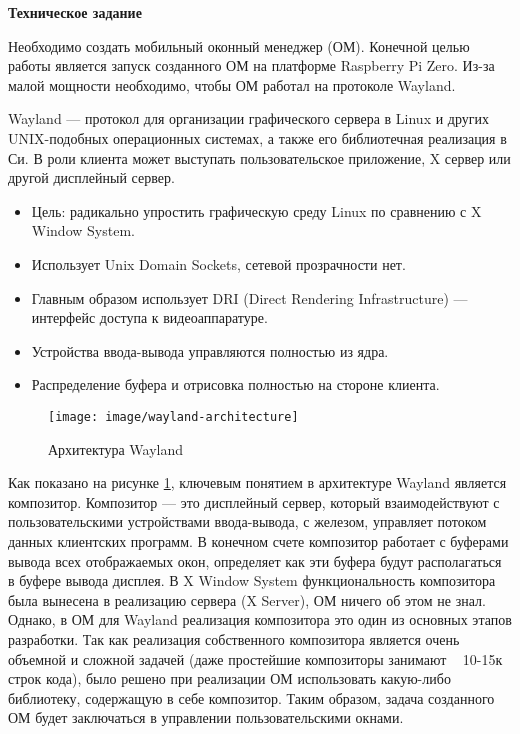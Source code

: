 \documentclass[11pt,a4paper]{extarticle}
\begin{document}
\large{\textbf{Техническое задание}}

Необходимо создать мобильный оконный менеджер (ОМ). Конечной целью работы является запуск созданного ОМ на платформе Raspberry Pi Zero. Из-за малой мощности необходимо, чтобы ОМ работал на протоколе Wayland.

Wayland --- протокол для организации графического сервера в Linux и других UNIX-подобных операционных системах, а также его библиотечная реализация в Си. В роли клиента может выступать пользовательское приложение, X сервер или другой дисплейный сервер. 
\begin{itemize}
\item Цель: радикально упростить графическую среду Linux по сравнению с X Window System.
\item Использует Unix Domain Sockets, сетевой прозрачности нет. 
\item Главным образом использует DRI (Direct Rendering Infrastructure) --- интерфейс доступа к видеоаппаратуре. 
\item Устройства ввода-вывода управляются полностью из ядра. 
\item Распределение буфера и отрисовка полностью на стороне клиента.
\end{itemize}

\begin{figure}[h!]
\center
\texttt{[image: image/wayland-architecture]}
\caption{Архитектура Wayland}
\label{img:wayland-architecture}
\end{figure}

Как показано на рисунке \ref{img:wayland-architecture}, ключевым понятием в архитектуре Wayland является композитор. Композитор --- это дисплейный сервер, который взаимодействуют с пользовательскими устройствами ввода-вывода, с железом, управляет потоком данных клиентских программ. В конечном счете композитор работает с буферами вывода всех отображаемых окон, определяет как эти буфера будут располагаться в буфере вывода дисплея. В X Window System функциональность композитора была вынесена в реализацию сервера (X Server), ОМ ничего об этом не знал. Однако, в ОМ для Wayland реализация композитора это один из основных этапов разработки. Так как реализация собственного композитора является очень объемной и сложной задачей (даже простейшие композиторы занимают ~ 10-15к строк кода), было решено при реализации ОМ использовать какую-либо библиотеку, содержащую в себе композитор. Таким образом, задача созданного ОМ будет заключаться в управлении пользовательскими окнами.
\end{document}
